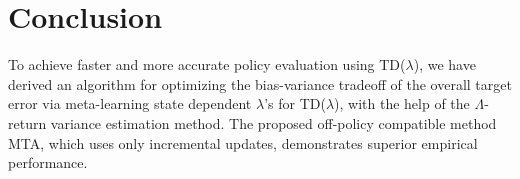 \documentclass{article}
\begin{document}
\section{Conclusion}
To achieve faster and more accurate policy evaluation using TD($\lambda$), we have derived an algorithm for optimizing the bias-variance tradeoff of the overall target error via meta-learning state dependent $\lambda$'s for TD($\lambda$), with the help of the $\Lambda$-return variance estimation method. The proposed off-policy compatible method MTA, which uses only incremental updates, demonstrates superior empirical performance.





\newpage

\end{document}
